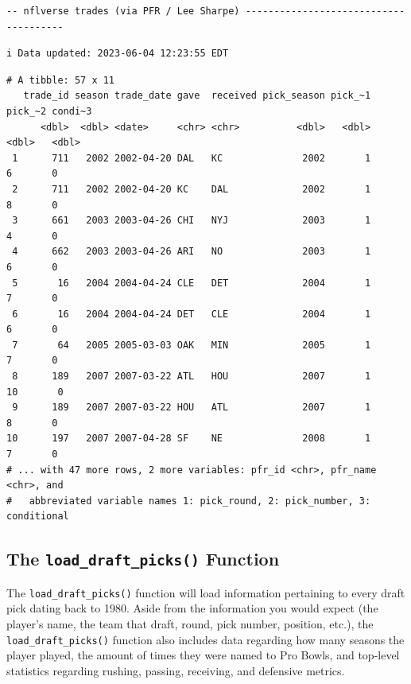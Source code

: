 \documentclass[
  letterpaper,
]{krantz}
\begin{document}
\begin{verbatim}
-- nflverse trades (via PFR / Lee Sharpe) --------------------------------------
\end{verbatim}

\begin{verbatim}
i Data updated: 2023-06-04 12:23:55 EDT
\end{verbatim}

\begin{verbatim}
# A tibble: 57 x 11
   trade_id season trade_date gave  received pick_season pick_~1 pick_~2 condi~3
      <dbl>  <dbl> <date>     <chr> <chr>          <dbl>   <dbl>   <dbl>   <dbl>
 1      711   2002 2002-04-20 DAL   KC              2002       1       6       0
 2      711   2002 2002-04-20 KC    DAL             2002       1       8       0
 3      661   2003 2003-04-26 CHI   NYJ             2003       1       4       0
 4      662   2003 2003-04-26 ARI   NO              2003       1       6       0
 5       16   2004 2004-04-24 CLE   DET             2004       1       7       0
 6       16   2004 2004-04-24 DET   CLE             2004       1       6       0
 7       64   2005 2005-03-03 OAK   MIN             2005       1       7       0
 8      189   2007 2007-03-22 ATL   HOU             2007       1      10       0
 9      189   2007 2007-03-22 HOU   ATL             2007       1       8       0
10      197   2007 2007-04-28 SF    NE              2008       1       7       0
# ... with 47 more rows, 2 more variables: pfr_id <chr>, pfr_name <chr>, and
#   abbreviated variable names 1: pick_round, 2: pick_number, 3: conditional
\end{verbatim}

\hypertarget{the-load_draft_picks-function}{%
\subsection{\texorpdfstring{The \texttt{load\_draft\_picks()}
Function}{The load\_draft\_picks() Function}}\label{the-load_draft_picks-function}}

The \texttt{load\_draft\_picks()} function will load information
pertaining to every draft pick dating back to 1980. Aside from the
information you would expect (the player's name, the team that draft,
round, pick number, position, etc.), the \texttt{load\_draft\_picks()}
function also includes data regarding how many seasons the player
played, the amount of times they were named to Pro Bowls, and top-level
statistics regarding rushing, passing, receiving, and defensive metrics.
\end{document}
